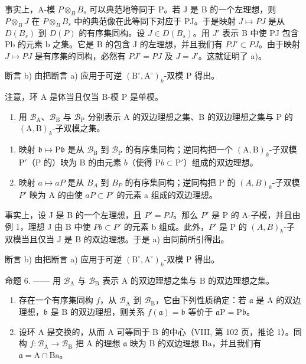 事实上，A-模 \(P \otimes_{B} B_{s}\) 可以典范地等同于 P。若 J 是 B 的一个左理想，则 \(P \otimes_{B} J\) 在 \(P \otimes_{B} B_{s}\) 中的典范像在此等同下对应于 PJ。于是映射 \(J \mapsto PJ\) 是从 \(D(B_{s})\) 到 \(D(P)\) 的有序集同构。设 \(J \in D(B_{s})\)。用 \(J'\) 表示 B 中使 PJ 包含 Pb 的元素 b 之集。它是 B 的包含 J 的左理想，并且我们有 \(PJ' \subset PJ\)。由于映射 \(J \mapsto PJ\) 是有序集的同构，必然有 \(PJ' = PJ\) 及 \(J = J'\)。这就证明了 a)。

断言 b) 由把断言 a) 应用于可逆 \((\mathrm{B}^{\circ},\mathrm{A}^{\circ})_{k}\)-双模 P 得出。

注意，环 A 是体当且仅当 B-模 P 是单模。

\begin{enumerate}
\def\labelenumi{\arabic{enumi})}
\setcounter{enumi}{1}
\tightlist
\item
  用 \(\mathcal{B}_{\mathrm{A}}\)、\(\mathcal{B}_{\mathrm{B}}\) 与 \(\mathcal{B}_{\mathrm{P}}\) 分别表示 A 的双边理想之集、B 的双边理想之集与 P 的 \((\mathrm{A},\mathrm{B})_k\)-子双模之集。
\end{enumerate}

\begin{enumerate}
\def\labelenumi{\alph{enumi})}
\item
  映射 \(\mathfrak{b} \mapsto \mathrm{P}\mathfrak{b}\) 是从 \(\mathcal{B}_{\mathrm{B}}\) 到 \(\mathcal{B}_{\mathrm{P}}\) 的有序集同构；逆同构把一个 \((\mathrm{A},\mathrm{B})_k\)-子双模 \(\mathrm{P}'\)（\(\mathrm{P}\) 的）映为 \(\mathrm{B}\) 的由元素 \(b\)（使得 \(\mathrm{P}b \subset \mathrm{P}'\)）组成的双边理想。
\item
  映射 \(a \mapsto aP\) 是从 \(B_{A}\) 到 \(B_{P}\) 的有序集同构；逆同构把 P 的 \((A, B)_{k}\)-子双模 \(P'\) 映为 A 的由使 \(aP \subset P'\) 的元素 a 组成的双边理想。
\end{enumerate}

事实上，设 J 是 B 的一个左理想，且 \(P' = PJ\)。那么 \(P'\) 是 P 的 A-子模，并且由例 1，理想 J 由 B 中使 \(Pb \subset P'\) 的元素 b 组成。此外，\(P'\) 是 P 的 \((A, B)_{k}\)-子双模当且仅当 J 是 B 的双边理想。于是 a) 由同前所引得出。

断言 b) 由把断言 a) 应用于可逆 \((\mathrm{B}^{\circ}, \mathrm{A}^{\circ})_{k}\)-双模 P 得出。

命题 6. —— 用 \(\mathcal{B}_{\mathrm{A}}\) 与 \(\mathcal{B}_{\mathrm{B}}\) 表示 A 的双边理想之集与 B 的双边理想之集。

\begin{enumerate}
\def\labelenumi{\alph{enumi})}
\item
  存在一个有序集同构 \(f\)，从 \(\mathcal{B}_{\mathrm{A}}\) 到 \(\mathcal{B}_{\mathrm{B}}\)，它由下列性质确定：若 \(\mathfrak{a}\) 是 \(\mathrm{A}\) 的双边理想，\(\mathfrak{b}\) 是 \(\mathrm{B}\) 的双边理想，则关系 \(f(\mathfrak{a}) = \mathfrak{b}\) 等价于 \(\mathfrak{a}\mathrm{P} = \mathrm{P}\mathfrak{b}\)。
\item
  设环 A 是交换的，从而 A 可等同于 B 的中心（VIII, 第 102 页，推论 1）。同构 \(f: \mathcal{B}_{\mathrm{A}} \to \mathcal{B}_{\mathrm{B}}\) 把 A 的理想 \(\mathfrak{a}\) 映为 B 的双边理想 \(\mathrm{Ba}\)，并且我们有 \(\mathfrak{a} = \mathrm{A} \cap \mathrm{Ba}\)。
\end{enumerate}

